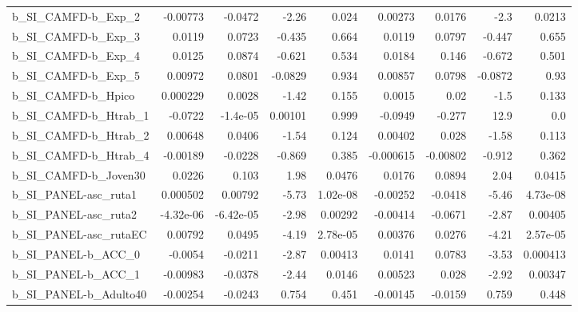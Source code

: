 \begin{tabular}{lrrrrrrrr}
b\_SI\_CAMFD-b\_Exp\_2         &    -0.00773 &      -0.0472 &    -2.26 &    0.024 &    0.00273 &      0.0176 &         -2.3 &        0.0213 \\
b\_SI\_CAMFD-b\_Exp\_3         &      0.0119 &       0.0723 &   -0.435 &    0.664 &     0.0119 &      0.0797 &       -0.447 &         0.655 \\
b\_SI\_CAMFD-b\_Exp\_4         &      0.0125 &       0.0874 &   -0.621 &    0.534 &     0.0184 &       0.146 &       -0.672 &         0.501 \\
b\_SI\_CAMFD-b\_Exp\_5         &     0.00972 &       0.0801 &  -0.0829 &    0.934 &    0.00857 &      0.0798 &      -0.0872 &          0.93 \\
b\_SI\_CAMFD-b\_Hpico         &    0.000229 &       0.0028 &    -1.42 &    0.155 &     0.0015 &        0.02 &         -1.5 &         0.133 \\
b\_SI\_CAMFD-b\_Htrab\_1       &     -0.0722 &     -1.4e-05 &  0.00101 &    0.999 &    -0.0949 &      -0.277 &         12.9 &           0.0 \\
b\_SI\_CAMFD-b\_Htrab\_2       &     0.00648 &       0.0406 &    -1.54 &    0.124 &    0.00402 &       0.028 &        -1.58 &         0.113 \\
b\_SI\_CAMFD-b\_Htrab\_4       &    -0.00189 &      -0.0228 &   -0.869 &    0.385 &  -0.000615 &    -0.00802 &       -0.912 &         0.362 \\
b\_SI\_CAMFD-b\_Joven30       &      0.0226 &        0.103 &     1.98 &   0.0476 &     0.0176 &      0.0894 &         2.04 &        0.0415 \\
b\_SI\_PANEL-asc\_ruta1       &    0.000502 &      0.00792 &    -5.73 & 1.02e-08 &   -0.00252 &     -0.0418 &        -5.46 &      4.73e-08 \\
b\_SI\_PANEL-asc\_ruta2       &   -4.32e-06 &    -6.42e-05 &    -2.98 &  0.00292 &   -0.00414 &     -0.0671 &        -2.87 &       0.00405 \\
b\_SI\_PANEL-asc\_rutaEC      &     0.00792 &       0.0495 &    -4.19 & 2.78e-05 &    0.00376 &      0.0276 &        -4.21 &      2.57e-05 \\
b\_SI\_PANEL-b\_ACC\_0         &     -0.0054 &      -0.0211 &    -2.87 &  0.00413 &     0.0141 &      0.0783 &        -3.53 &      0.000413 \\
b\_SI\_PANEL-b\_ACC\_1         &    -0.00983 &      -0.0378 &    -2.44 &   0.0146 &    0.00523 &       0.028 &        -2.92 &       0.00347 \\
b\_SI\_PANEL-b\_Adulto40      &    -0.00254 &      -0.0243 &    0.754 &    0.451 &   -0.00145 &     -0.0159 &        0.759 &         0.448 \\

\end{tabular}
